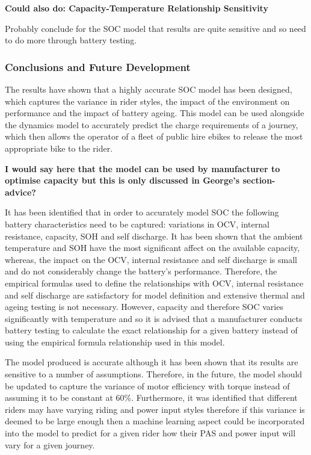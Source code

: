 \documentclass[a4paper, 10pt]{article}
\numberwithin{equation}{section}
\begin{document}
\textbf{Could also do: Capacity-Temperature Relationship Sensitivity}


Probably conclude for the SOC model that results are quite sensitive and so need to do more through battery testing.

\subsubsection{Conclusions and Future Development}

The results have shown that a highly accurate SOC model has been designed, which captures the variance in rider styles, the impact of the environment on performance and the impact of battery ageing. This model can be used alongside the dynamics model to accurately predict the charge requirements of a journey, which then allows the operator of a fleet of public hire ebikes to release the most appropriate bike to the rider.

\textbf{I would say here that the model can be used by manufacturer to optimise capacity but this is only discussed in George's section- advice?}

It has been identified that in order to accurately model SOC the following battery characteristics need to be captured: variations in OCV, internal resistance, capacity, SOH and self discharge.
It has been shown that the ambient temperature and SOH have the most significant affect on the available capacity, whereas, the impact on the OCV, internal resistance and self discharge is small and do not considerably change the battery's performance. Therefore, the empirical formulas used to define the relationships with OCV, internal resistance and self discharge are satisfactory for model definition and extensive thermal and ageing testing is not necessary. However, capacity and therefore SOC varies significantly with temperature and so it is advised that a manufacturer conducts battery testing to calculate the exact relationship for a given battery instead of using the empirical formula relationship used in this model.

The model produced is accurate although it has been shown that its results are sensitive to a number of assumptions. Therefore, in the future, the model should be updated to capture the variance of motor efficiency with torque instead of assuming it to be constant at 60\%. Furthermore, it was identified that different riders may have varying riding and power input styles therefore if this variance is deemed to be large enough then a machine learning aspect could be incorporated into the model to predict for a given rider how their PAS and power input will vary for a given journey.
\end{document}
